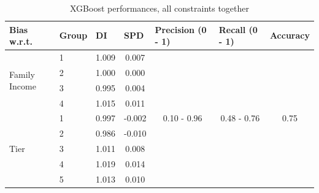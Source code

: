 \documentclass{article}
\begin{document}
\begin{table}[H]
\caption{XGBoost performances, all constraints together}
\begin{tabular}{llcc|ccc}
\hline
Bias w.r.t.                    & Group & \multicolumn{1}{l}{DI} & \multicolumn{1}{l}{SPD}    & \multicolumn{1}{l}{Precision (0 - 1)} & \multicolumn{1}{l}{Recall (0 - 1)} & \multicolumn{1}{l}{Accuracy} \\
\hline
\multirow{4}{*}{Family Income} & 1     & 1.009                  & 0.007                      & \multirow{13}{*}{0.10 - 0.96}         & \multirow{13}{*}{0.48 - 0.76}      & \multirow{13}{*}{0.75}       \\
                               & 2     & 1.000                  & 0.000                      &                                       &                                    &                              \\
                               & 3     & 0.995                  & 0.004                      &                                       &                                    &                              \\
                               & 4     & 1.015                  & 0.011                      &                                       &                                    &                              \\
\cline{1-4}
\multirow{5}{*}{Tier}          & 1     & 0.997                  & -0.002                     &                                       &                                    &                              \\
                               & 2     & 0.986                  & -0.010                     &                                       &                                    &                              \\
                               & 3     & 1.011                  & 0.008                      &                                       &                                    &                              \\
                               & 4     & 1.019                  & 0.014                      &                                       &                                    &                              \\
                               & 5     & 1.013                  & 0.010                      &                                       &                                    &                              \\

\end{tabular}
\end{table}
\end{document}
